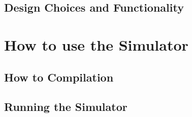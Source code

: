 \documentclass[letterpaper, 11pt, twoside]{article}
\begin{document}
\paragraph{}

\subsection{Design Choices and Functionality}
\paragraph{}


\cleardoublepage

\section[Simulator Usage]{How to use the Simulator}
\paragraph{}

\subsection[Compilation]{How to Compilation}
\paragraph{}

\subsection[Simulator Command]{Running the Simulator}
\paragraph{}
\end{document}
